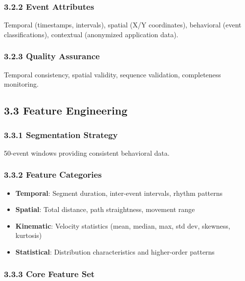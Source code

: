 \documentclass[
  11pt,
  a4paper,
]{article}
\providecommand{\tightlist}{%
  \setlength{\itemsep}{0pt}\setlength{\parskip}{0pt}}
\begin{document}
\subsubsection{3.2.2 Event Attributes}\label{event-attributes}

Temporal (timestamps, intervals), spatial (X/Y coordinates), behavioral
(event classifications), contextual (anonymized application data).

\subsubsection{3.2.3 Quality Assurance}\label{quality-assurance}

Temporal consistency, spatial validity, sequence validation,
completeness monitoring.

\subsection{3.3 Feature Engineering}\label{feature-engineering}

\subsubsection{3.3.1 Segmentation Strategy}\label{segmentation-strategy}

50-event windows providing consistent behavioral data.

\subsubsection{3.3.2 Feature Categories}\label{feature-categories}

\begin{itemize}
\tightlist
\item
  \textbf{Temporal}: Segment duration, inter-event intervals, rhythm
  patterns
\item
  \textbf{Spatial}: Total distance, path straightness, movement range
\item
  \textbf{Kinematic}: Velocity statistics (mean, median, max, std dev,
  skewness, kurtosis)
\item
  \textbf{Statistical}: Distribution characteristics and higher-order
  patterns
\end{itemize}

\subsubsection{3.3.3 Core Feature Set}\label{core-feature-set}
\end{document}
